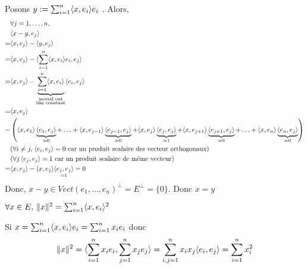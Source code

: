 \begin{preuve}
    Posons $y := \sum_{i=1}^{n} \langle x, e_i \rangle e_i$ . Alors, 
   \begin{align*}
       &\forall j = 1, \ldots, n,\\
       &\langle x - y, e_j \rangle\\ 
       = &\langle x, e_j \rangle - \langle y, e_j \rangle\\ 
       = &\langle x, e_j \rangle - \langle \sum_{i=1}^{n} \langle x, e_i \rangle e_i, e_j \rangle\\ 
       = &\langle x, e_j \rangle - \underbrace{ \sum_{i=1}^{n} \langle x, e_i \rangle }_{\substack{\text{moved out}\\ \text{like constant}}}\langle e_i, e_j \rangle\\ 
       = &\langle x, e_j \rangle\\ 
       -& \left(\langle x, e_1 \rangle\underbrace{ \langle e_1, e_j \rangle }_{= 0} + \ldots + \langle x, e_{j-1} \rangle\underbrace{\langle e_{j-1}, e_j \rangle}_{= 0} + \langle x, e_{j} \rangle\underbrace{ \langle e_{j}, e_j \rangle }_{= 1} + \langle x, e_{j+1} \rangle\underbrace{ \langle e_{j+1}, e_j \rangle }_{= 0} + \ldots + \langle x, e_{n} \rangle\underbrace{ \langle e_{n}, e_j \rangle }_{= 0}\right)\\
        &\text{(} \forall i \neq j, \, \langle e_i, e_j \rangle = 0 \text{ car un produit scalaire des vecteur orthogonaux)}\\ 
        &\text{(} \forall j \, \langle e_j, e_j \rangle = 1 \text{ car un produit scalaire de même vecteur)}\\
       = &\langle x, e_j \rangle - \langle x, e_j \rangle\underset{= 1}{\langle e_j, e_j \rangle} = 0
   \end{align*}
   Donc, $x - y \in Vect(e_1, \ldots, e_n)^{\perp} = E^{\perp} = \{0\}$. Donc $x = y$
\end{preuve}
\begin{corollary}
    $\forall x \in E, \, \|x\|^2 = \sum_{i=1}^{n} \langle x, e_i \rangle^2$ 
\end{corollary}
\begin{preuve}
    Si $x = \sum_{i=1}^{n} \langle x, e_i \rangle e_i = \sum_{i=1}^{n} x_ie_i$ donc
    \[
        \|x\|^2 = \langle \sum_{i=1}^{n} x_ie_i, \sum_{j=1}^{n} x_je_j \rangle = \sum_{i,j=1}^{n} x_ix_j\langle e_i, e_j \rangle = \sum_{i=1}^{n} x_i^2
    \] 
\end{preuve}
